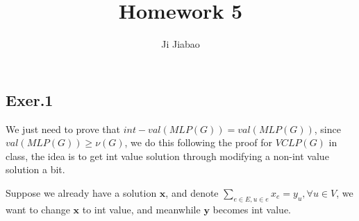 \documentclass[UTF8]{ctexart}
\begin{document}
 

\title{Homework 5}
\author{Ji Jiabao}
\maketitle

\subsection*{Exer.1}
    We just need to prove that $int-val(MLP(G)) = val(MLP(G))$, since $val(MLP(G)) \ge \nu(G)$,
    we do this following the proof for $VCLP(G)$ in class, the idea is to get int value solution
    through modifying a non-int value solution a bit.

    Suppose we already have a solution $\mathbf{x}$, 
    and denote $\sum_{e \in E, u \in e}x_e = y_u, \forall u \in V$, we want to change $\mathbf{x}$ to int value,
    and meanwhile $\mathbf{y}$ becomes int value.
\end{document}
